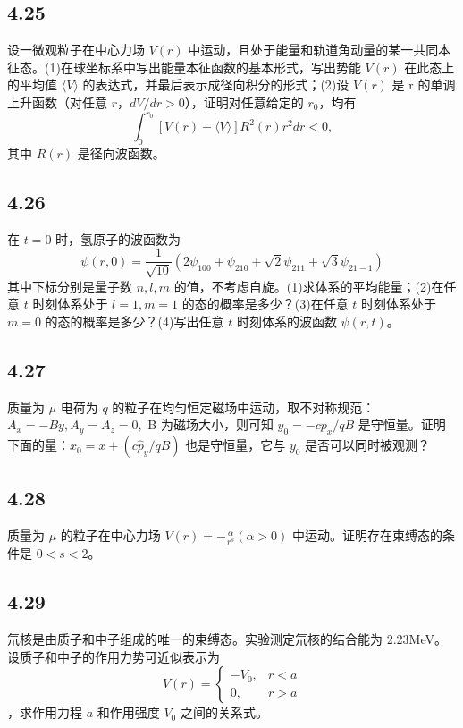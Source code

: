 \subsection{4.25}
设一微观粒子在中心力场 $V(r)$ 中运动，且处于能量和轨道角动量的某一共同本征态。(1)在球坐标系中写出能量本征函数的基本形式，写出势能 $V(r)$ 在此态上的平均值 $\langle V \rangle$ 的表达式，并最后表示成径向积分的形式；(2)设 $V(r)$ 是 r 的单调上升函数（对任意 $ r $，$ dV/dr > 0 $），证明对任意给定的 $ r_0 $，均有
$$ \int_{0}^{r_0} [V(r) - \langle V \rangle] R^2 (r) r^2 dr < 0, $$
其中 $ R(r) $ 是径向波函数。

\subsection{4.26}
在 $ t = 0 $ 时，氢原子的波函数为
$$ \psi(r, 0) = \frac{1}{\sqrt{10}} (2 \psi_{100} + \psi_{210} + \sqrt{2} \psi_{211} + \sqrt{3} \psi_{21-1}) $$
其中下标分别是量子数 $ n, l, m $ 的值，不考虑自旋。(1)求体系的平均能量；(2)在任意 $ t $ 时刻体系处于 $ l = 1, m = 1 $ 的态的概率是多少？(3)在任意 $ t $ 时刻体系处于 $ m = 0 $ 的态的概率是多少？(4)写出任意 $ t $ 时刻体系的波函数 $ \psi(r, t) $。

\subsection{4.27}
质量为 $ \mu $ 电荷为 $ q $ 的粒子在均匀恒定磁场中运动，取不对称规范：
$ A_x = -By, A_y = A_z = 0, $
B 为磁场大小，则可知 $ y_0 = -c p_x /q B $ 是守恒量。证明下面的量：$ x_0 = x + (c \hat{p}_y / qB) $ 也是守恒量，它与 $ y_0 $ 是否可以同时被观测？

\subsection{4.28}
质量为 $\mu$ 的粒子在中心力场 $ V(r) = -\frac{\alpha}{r^s} (\alpha > 0) $ 中运动。证明存在束缚态的条件是 $ 0 < s < 2 $。

\subsection{4.29}
氘核是由质子和中子组成的唯一的束缚态。实验测定氘核的结合能为 2.23MeV。设质子和中子的作用力势可近似表示为 $$ V(r) = 
\begin{cases}
-V_0, & r < a \\
0, & r > a
\end{cases} $$，求作用力程 $ a $ 和作用强度 $ V_0 $ 之间的关系式。

